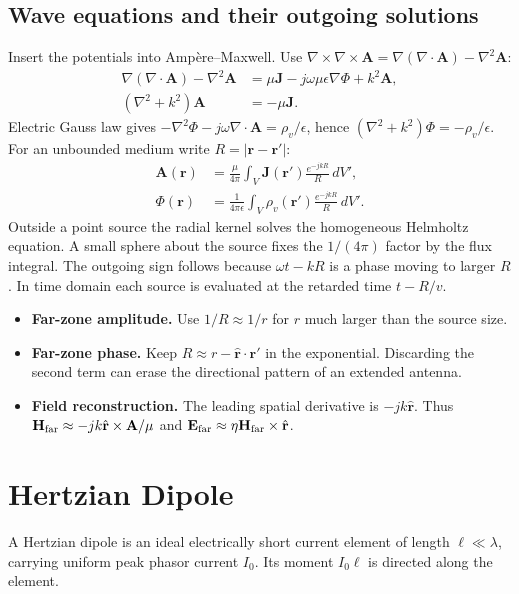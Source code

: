 \documentclass[12pt,a4paper]{article}
\begin{document}
\subsection{Wave equations and their outgoing solutions}
Insert the potentials into Amp\`ere--Maxwell. Use $\nabla\times\nabla\times\mathbf A=\nabla(\nabla\cdot\mathbf A)-\nabla^2\mathbf A$:
\[
\begin{aligned}
\nabla(\nabla\cdot\mathbf A)-\nabla^2\mathbf A
 &=\mu\mathbf J-j\omega\mu\epsilon\nabla\Phi+k^2\mathbf A,\\
(\nabla^2+k^2)\mathbf A&=-\mu\mathbf J.
\end{aligned}
\]
Electric Gauss law gives $-\nabla^2\Phi-j\omega\nabla\cdot\mathbf A=\rho_v/\epsilon$, hence $(\nabla^2+k^2)\Phi=-\rho_v/\epsilon$. For an unbounded medium write $R=|\mathbf r-\mathbf r'|$:
\[
\begin{aligned}
\mathbf A(\mathbf r)&=\frac{\mu}{4\pi}\int_V
     \mathbf J(\mathbf r')\frac{e^{-jkR}}{R}\,dV',\\
\Phi(\mathbf r)&=\frac{1}{4\pi\epsilon}\int_V
     \rho_v(\mathbf r')\frac{e^{-jkR}}{R}\,dV'.
\end{aligned}
\]
Outside a point source the radial kernel solves the homogeneous Helmholtz equation. A small sphere about the source fixes the $1/(4\pi)$ factor by the flux integral. The outgoing sign follows because $\omega t-kR$ is a phase moving to larger $R$. In time domain each source is evaluated at the retarded time $t-R/v$.
\begin{itemize}[leftmargin=*,itemsep=3pt]
\item \textbf{Far-zone amplitude.} Use $1/R\approx1/r$ for $r$ much larger than the source size.
\item \textbf{Far-zone phase.} Keep $R\approx r-\hat{\mathbf r}\cdot\mathbf r'$ in the exponential. Discarding the second term can erase the directional pattern of an extended antenna.
\item \textbf{Field reconstruction.} The leading spatial derivative is $-jk\hat{\mathbf r}$. Thus $\mathbf H_{\rm far}\approx-jk\hat{\mathbf r}\times\mathbf A/\mu$ and $\mathbf E_{\rm far}\approx\eta\mathbf H_{\rm far}\times\hat{\mathbf r}$.
\end{itemize}

\section{Hertzian Dipole}
\begin{tcolorbox}[defbox,title={Hertzian dipole}]
A Hertzian dipole is an ideal electrically short current element of length $\ell\ll\lambda$, carrying uniform peak phasor current $I_0$. Its moment $I_0\ell$ is directed along the element.
\end{tcolorbox}
\end{document}
